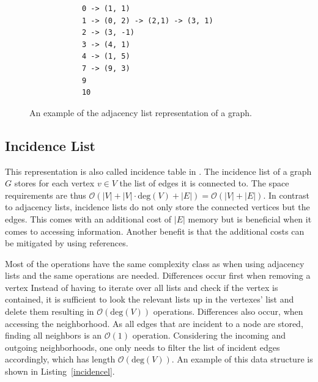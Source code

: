         \begin{figure}[htp]
         \begin{center}
          \begin{verbatim}
            0 -> (1, 1)
            1 -> (0, 2) -> (2,1) -> (3, 1)
            2 -> (3, -1)
            3 -> (4, 1)
            4 -> (1, 5)
            7 -> (9, 3)
            9
            10
          \end{verbatim}
         \end{center}
         \caption{An example of the adjacency list representation of a graph.}
         \label{adjl}
        \end{figure}
        
        \subsection*{Incidence List}\label{inci}
            This representation is also called incidence table in \autocite{Gross1998GraphTA}.
            The incidence list of a graph $G$ stores for each vertex $v \in V$ the list of edges it is connected to. 
            The space requirements are thus $\mathcal{O}(|V| + |V| \cdot \text{deg}(V) + |E|) = \mathcal{O}(|V| + |E|)$. 
            In contrast to adjacency lists, incidence lists do not only store the connected vertices but the edges. 
            This comes with an additional cost of $|E|$ memory but is beneficial when it comes to accessing information. 
            Another benefit is that the additional costs can be mitigated by using references.
            
            Most of the operations have the same complexity class as when using adjacency lists and the same operations are needed. 
            Differences occur first when removing a vertex
            Instead of having to iterate over all lists and check if the vertex is contained, it is sufficient to look the relevant lists up in the vertexes' list and delete them resulting in $\mathcal{O}(\text{deg}(V))$ operations.        
            Differences also occur, when accessing the neighborhood. 
            As all edges that are incident to a node are stored, finding all neighbors is an $\mathcal{O}(1)$ operation. 
            Considering the incoming and outgoing neighborhoods, one only needs to filter the list of incident edges accordingly, which has length $\mathcal{O}(\text{deg}(V))$.
            An example of this data structure is shown in Listing~\ref{incidencel}.
        
